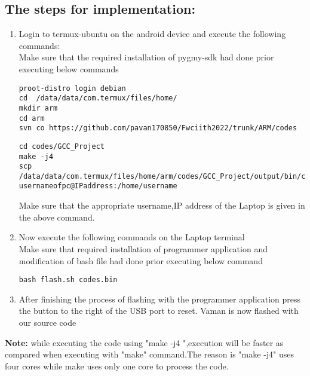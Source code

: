 \documentclass[10pt, a4paper]{article}
\begin{document}
\subsection{The steps for implementation:}
\begin{enumerate}
\item Login to termux-ubuntu on the android device and execute the following commands:\\
Make sure that the required installation of pygmy-sdk had done prior executing below commands
\begin{lstlisting}
proot-distro login debian
cd  /data/data/com.termux/files/home/
mkdir arm
cd arm
svn co https://github.com/pavan170850/Fwciith2022/trunk/ARM/codes
\end{lstlisting}
\begin{lstlisting}
cd codes/GCC_Project
make -j4
scp /data/data/com.termux/files/home/arm/codes/GCC_Project/output/bin/codes.bin usernameofpc@IPaddress:/home/username
\end{lstlisting}
Make sure that the appropriate username,IP address of the Laptop is given in the above command.
\item Now execute the following commands on the Laptop terminal\\
Make sure that required installation of programmer application and modification of bash file had done prior executing below command
\begin{lstlisting}
bash flash.sh codes.bin
\end{lstlisting}
\item After finishing the process of flashing with the programmer application press the button to the right of the USB port to reset. Vaman is now flashed with our source code
\end{enumerate}
\textbf{Note:}
while executing the code using "make -j4 ",execution will be faster as compared when executing with "make" command.The reason is "make -j4" uses four cores while make uses only one core to process the code.



\end{document}
